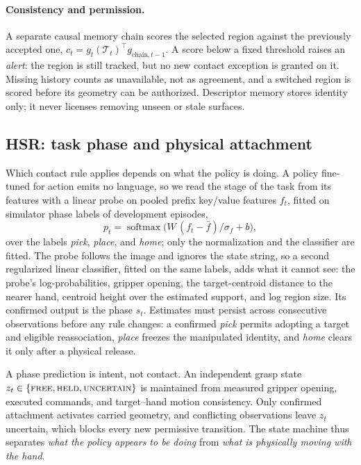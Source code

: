 \paragraph{Consistency and permission.}
A separate causal memory chain scores the selected region against the previously accepted one, $c_t=g_t(\mathcal T_t)^\top g_{\mathrm{chain},t-1}$. A score below a fixed threshold raises an \emph{alert}: the region is still tracked, but no new contact exception is granted on it. Missing history counts as unavailable, not as agreement, and a switched region is scored before its geometry can be authorized. Descriptor memory stores identity only; it never licenses removing unseen or stale surfaces.

\subsection{HSR: task phase and physical attachment}
\label{sec:phase}
Which contact rule applies depends on what the policy is doing. A policy fine-tuned for action emits no language, so we read the stage of the task from its features with a linear probe on pooled prefix key/value features $f_t$, fitted on simulator phase labels of development episodes,
\begin{equation}
 p_t=\operatorname{softmax}\!\big(W\,(f_t-\bar f)/\sigma_f+b\big),
 \label{eq:probe}
\end{equation}
over the labels \emph{pick}, \emph{place}, and \emph{home}; only the normalization and the classifier are fitted. The probe follows the image and ignores the state string, so a second regularized linear classifier, fitted on the same labels, adds what it cannot see: the probe's log-probabilities, gripper opening, the target-centroid distance to the nearer hand, centroid height over the estimated support, and log region size. Its confirmed output is the phase $s_t$. Estimates must persist across consecutive observations before any rule changes: a confirmed \emph{pick} permits adopting a target and eligible reassociation, \emph{place} freezes the manipulated identity, and \emph{home} clears it only after a physical release.

A phase prediction is intent, not contact. An independent grasp state $z_t\in\{\textsc{free},\textsc{held},\textsc{uncertain}\}$ is maintained from measured gripper opening, executed commands, and target--hand motion consistency. Only confirmed attachment activates carried geometry, and conflicting observations leave $z_t$ uncertain, which blocks every new permissive transition. The state machine thus separates \emph{what the policy appears to be doing} from \emph{what is physically moving with the hand}.

